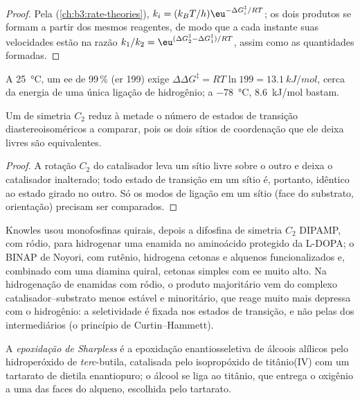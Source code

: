 \begin{proof}
Pela  (\cref{ch:b3:rate-theories}),
$k_i = (k_BT/h)\eu^{-\Delta G_i^\ddagger/RT}$; os dois produtos se formam a partir dos mesmos reagentes, de modo que a cada instante
suas velocidades estão na razão $k_1/k_2 = \eu^{(\Delta G_2^\ddagger - \Delta G_1^\ddagger)/RT}$, assim como as quantidades formadas.
\end{proof}

A \qty{25}{\celsius}, um ee de 99\,\% (er 199) exige $\Delta\Delta G^\ddagger = RT\ln 199 = \qty{13.1}{kJ/mol}$, cerca da energia de uma
única ligação de hidrogênio; a \qty{-78}{\celsius}, \qty{8.6}{kJ/mol} bastam.

\begin{proposition}\label{prop:b3:asymmetric-synthesis:c2}
Um  de simetria $C_2$ reduz à metade o número de estados de transição
diastereoisoméricos a comparar, pois os dois sítios de coordenação que ele deixa livres são
equivalentes.
\end{proposition}

\begin{proof}
A rotação $C_2$ do catalisador leva um sítio livre sobre o outro e deixa o
catalisador inalterado; todo estado de transição em um sítio é, portanto, idêntico ao
estado girado no outro. Só os modos de ligação em um sítio (face do substrato,
orientação) precisam ser comparados.
\end{proof}

Knowles usou monofosfinas quirais, depois a difosfina de simetria $C_2$ DIPAMP, com ródio, para
hidrogenar uma enamida no aminoácido protegido da L-DOPA; o BINAP de Noyori,
com rutênio, hidrogena cetonas e alquenos funcionalizados e,
combinado com uma diamina quiral, cetonas simples com ee muito alto. Na
hidrogenação de enamidas com ródio, o produto majoritário vem do complexo catalisador--substrato
menos estável e minoritário, que reage muito mais depressa com o hidrogênio: a
seletividade é fixada nos estados de transição, e não pelas  dos
intermediários (o princípio de Curtin--Hammett).

\begin{definition}\label{def:b3:asymmetric-synthesis:sharpless}
A \emph{epoxidação de Sharpless} é a
epoxidação enantiosseletiva de álcoois alílicos pelo hidroperóxido de \textit{terc}-butila,
catalisada pelo isopropóxido de titânio(IV) com um tartarato de dietila enantiopuro; o
álcool se liga ao titânio, que entrega o oxigênio a uma das faces do
alqueno, escolhida pelo tartarato.
\end{definition}

